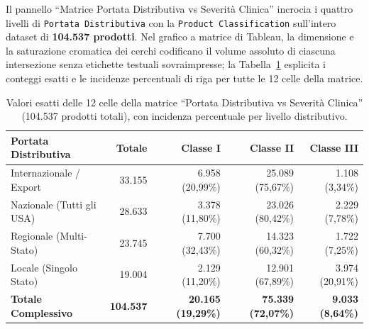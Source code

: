 Il pannello ``Matrice Portata Distributiva vs Severità Clinica'' incrocia i quattro livelli di \texttt{Portata Distributiva} con la \texttt{Product Classification} sull'intero dataset di \textbf{104.537 prodotti}. Nel grafico a matrice di Tableau, la dimensione e la saturazione cromatica dei cerchi codificano il volume assoluto di ciascuna intersezione senza etichette testuali sovraimpresse; la Tabella~\ref{tab:tableau_matrix} esplicita i conteggi esatti e le incidenze percentuali di riga per tutte le 12 celle della matrice.

\begin{table}[htbp]
\centering
\caption{Valori esatti delle 12 celle della matrice ``Portata Distributiva vs Severità Clinica'' (104.537 prodotti totali), con incidenza percentuale per livello distributivo.}
\label{tab:tableau_matrix}
\begin{tabularx}{\textwidth}{@{}Xrrrr@{}}
\toprule
\textbf{Portata Distributiva} & \textbf{Totale} & \textbf{Classe I} & \textbf{Classe II} & \textbf{Classe III} \\
\midrule
Internazionale / Export & 33.155 & 6.958 (20,99\%) & 25.089 (75,67\%) & 1.108 (3,34\%) \\
Nazionale (Tutti gli USA) & 28.633 & 3.378 (11,80\%) & 23.026 (80,42\%) & 2.229 (7,78\%) \\
Regionale (Multi-Stato) & 23.745 & 7.700 (32,43\%) & 14.323 (60,32\%) & 1.722 (7,25\%) \\
Locale (Singolo Stato) & 19.004 & 2.129 (11,20\%) & 12.901 (67,89\%) & 3.974 (20,91\%) \\
\midrule
\textbf{Totale Complessivo} & \textbf{104.537} & \textbf{20.165 (19,29\%)} & \textbf{75.339 (72,07\%)} & \textbf{9.033 (8,64\%)} \\
\bottomrule
\end{tabularx}
\end{table}

